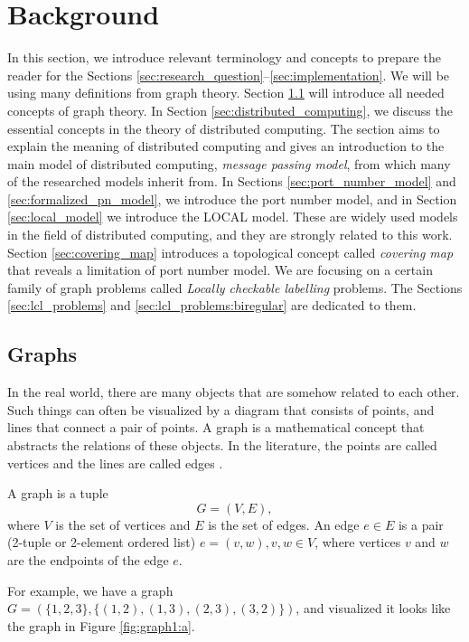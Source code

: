 
\section{Background} \label{sec:background}
In this section, we introduce relevant terminology and concepts to prepare the reader for the Sections \ref{sec:research_question}--\ref{sec:implementation}.
%
We will be using many definitions from graph theory.
Section \ref{sec:graphs} will introduce all needed concepts of graph theory.
%
In Section \ref{sec:distributed_computing}, we discuss the essential concepts in the theory of distributed computing.
The section aims to explain the meaning of distributed computing and gives an introduction to the main model of distributed computing, \emph{message passing model}, from which many of the researched models inherit from.
%
In Sections \ref{sec:port_number_model} and \ref{sec:formalized_pn_model}, we introduce the port number model, and in Section \ref{sec:local_model} we introduce the LOCAL model.
These are widely used models in the field of distributed computing, and they are strongly related to this work.
%
Section \ref{sec:covering_map} introduces a topological concept called \emph{covering map} that reveals a limitation of port number model.
%
We are focusing on a certain family of graph problems called \emph{Locally checkable labelling} problems.
The Sections \ref{sec:lcl_problems} and \ref{sec:lcl_problems:biregular} are dedicated to them.


\subsection{Graphs} \label{sec:graphs}
In the real world, there are many objects that are somehow related to each other.
Such things can often be visualized by a diagram that consists of points, and lines that connect a pair of points.
A graph is a mathematical concept that abstracts the relations of these objects.
In the literature, the points are called vertices and the lines are called edges
\cite{DBLP:books/others/BondyM76}.

\begin{definition}
A graph is a tuple $$G = (V, E),$$ where $V$ is the set of vertices and $E$ is the set of edges.
An edge $e \in E$ is a pair (2-tuple or 2-element ordered list) $e=(v, w), v, w \in V$, where vertices $v$ and $w$ are the endpoints of the edge $e$.
\end{definition}
For example, we have a graph $G=(\{1, 2, 3\}, \{(1, 2),(1, 3),(2, 3),(3, 2)\})$, and visualized it looks like the graph in Figure \ref{fig:graph1:a}.

